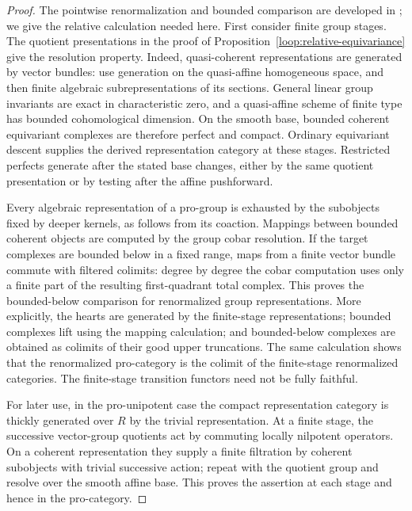 \documentclass[11pt]{article}
\numberwithin{equation}{section}
\theoremstyle{definition}
\theoremstyle{remark}
\begin{document}
\begin{proof}
The pointwise renormalization and bounded comparison are developed in
\cite[Sections~9.11--9.13 and~10.8]{RaskinHomological}; we give the
relative calculation needed here.  First consider finite group stages.
The quotient presentations in
the proof of Proposition~\ref{loop:relative-equivariance} give the
resolution property.  Indeed, quasi-coherent representations are
generated by vector bundles: use generation on the quasi-affine
homogeneous space, and then finite algebraic subrepresentations of
its sections.  General linear group invariants are exact in
characteristic zero, and a quasi-affine scheme of finite type has
bounded cohomological dimension.  On the smooth base, bounded coherent
equivariant complexes are therefore perfect and compact.  Ordinary
equivariant descent supplies the derived representation category at
these stages.  Restricted perfects generate after the stated base
changes, either by the same quotient presentation or by testing after
the affine pushforward.

Every algebraic representation of a pro-group is exhausted by the
subobjects fixed by deeper kernels, as follows from its coaction.
Mappings between bounded coherent objects are computed by the group
cobar resolution.  If the target complexes are bounded below in a
fixed range, maps from a finite vector bundle commute with filtered
colimits: degree by degree the cobar computation uses only a finite
part of the resulting first-quadrant total complex.  This proves the
bounded-below comparison for renormalized group representations.
More explicitly, the hearts are generated by the finite-stage
representations; bounded complexes lift using the mapping calculation;
and bounded-below complexes are obtained as colimits of their good
upper truncations.  The same calculation shows that the renormalized
pro-category is the colimit of the finite-stage renormalized
categories.  The finite-stage transition functors need not be fully
faithful.

For later use, in the pro-unipotent case the compact representation
category is thickly generated over $R$ by the trivial representation.
At a finite stage, the successive vector-group quotients act by
commuting locally nilpotent operators.  On a coherent representation
they supply a finite filtration by coherent subobjects with trivial
successive action; repeat with the quotient group and resolve over
the smooth affine base.  This proves the assertion at each stage and
hence in the pro-category.


\end{proof}
\end{document}
